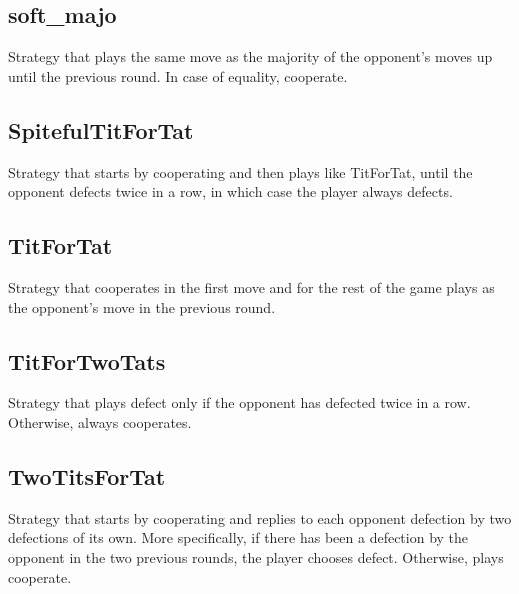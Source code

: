 \documentclass[12pt]{article}
\begin{document}
\subsection{soft\_majo}
Strategy that plays the same move as the majority of the opponent's moves up until the previous round. In case of equality, cooperate.

\subsection{SpitefulTitForTat}
Strategy that starts by cooperating and then plays like TitForTat, until the opponent defects twice in a row, in which case the player always defects.

\subsection{TitForTat}
Strategy that cooperates in the first move and for the rest of the game plays as the opponent's move in the previous round.

\subsection{TitForTwoTats}
Strategy that plays defect only if the opponent has defected twice in a row. Otherwise, always cooperates.

\subsection{TwoTitsForTat}
Strategy that starts by cooperating and replies to each opponent defection by two defections of its own. More specifically, if there has been a defection by the opponent in the two previous rounds, the player chooses defect. Otherwise, plays cooperate.
\end{document}
